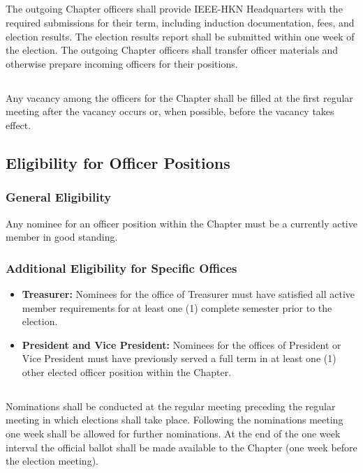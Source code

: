 \documentclass[10pt, oneside]{article}
\begin{document}
\subsection{}
The outgoing Chapter officers shall provide IEEE-HKN Headquarters with the required submissions for their term, including induction documentation, fees, and election results. The election results report shall be submitted within one week of the election. The outgoing Chapter officers shall transfer officer materials and otherwise prepare incoming officers for their positions.

\subsection{}
Any vacancy among the officers for the Chapter shall be filled at the first regular meeting after the vacancy occurs or, when possible, before the vacancy takes effect.

\subsection{Eligibility for Officer Positions}\label{OfficerReq}
\subsubsection{General Eligibility}
Any nominee for an officer position within the Chapter must be a currently active member in good standing.

\subsubsection{Additional Eligibility for Specific Offices}
\begin{itemize}
    \item \textbf{Treasurer:} Nominees for the office of Treasurer must have satisfied all active member requirements for at least one (1) complete semester prior to the election.
    \item \textbf{President and Vice President:} Nominees for the offices of President or Vice President must have previously served a full term in at least one (1) other elected officer position within the Chapter.
\end{itemize}

\subsection{}
Nominations shall be conducted at the regular meeting preceding the regular meeting in which elections shall take place. Following the nominations meeting one week shall be allowed for further nominations. At the end of the one week interval the official ballot shall be made available to the Chapter (one week before the election meeting).
\end{document}
